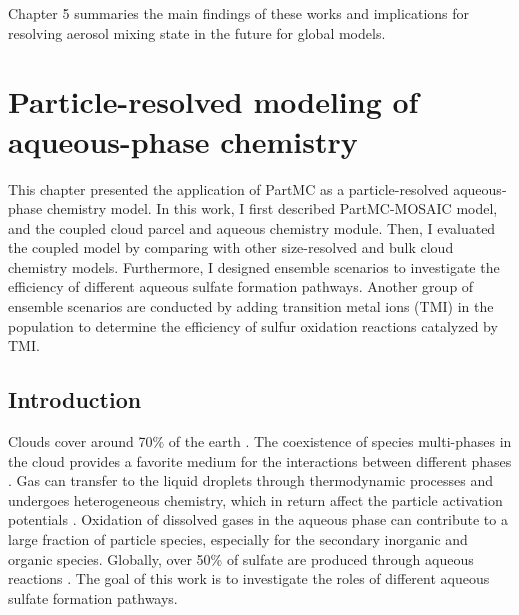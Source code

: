 \documentclass[edeposit,fullpage]{uiucthesis2009}
\begin{document}
Chapter 5 summaries the main findings of these works and implications for resolving aerosol mixing state in the future for global models.  
\chapter{Particle-resolved modeling of aqueous-phase chemistry}

This chapter presented the application of PartMC as a particle-resolved aqueous-phase chemistry model. In this work, I first described PartMC-MOSAIC model, and the coupled cloud parcel and aqueous chemistry module. Then, I evaluated the coupled model by comparing with other size-resolved and bulk cloud chemistry models. Furthermore, I designed ensemble scenarios to investigate the efficiency of different aqueous sulfate formation pathways. Another group of ensemble scenarios are conducted by adding transition metal ions (TMI) in the population to determine the efficiency of sulfur oxidation reactions catalyzed by TMI. 

\label{chap2:mon}
\section{Introduction}

Clouds cover around 70$\%$ of the earth \citep{Stubenrauch2013}. The coexistence of species multi-phases in the cloud provides a favorite medium for the interactions between different phases \citep{Deguillaume2005}. Gas can transfer to the liquid droplets through thermodynamic processes and undergoes heterogeneous chemistry, which in return affect the particle activation potentials \citep{Farmer2015, Henning2014}. Oxidation of dissolved gases in the aqueous phase can contribute to a large fraction of particle species, especially for the secondary inorganic and organic species. Globally, over 50\% of sulfate are produced through aqueous reactions \citep{Philip2014, Roth2016}. The goal of this work is to investigate the roles of different aqueous sulfate formation pathways. 
\end{document}
